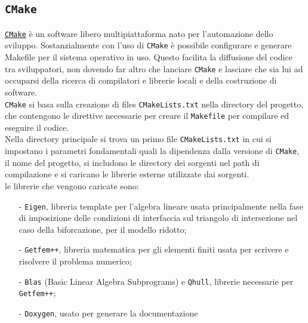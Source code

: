 \subsection{\texttt{CMake}}
\href{http://www.cmake.org/}{\texttt{CMake}} è un software libero multipiattaforma nato per l'automazione dello sviluppo. Sostanzialmente con l'uso di \texttt{CMake} è possibile configurare e generare Makefile per il sistema operativo in uso. Questo facilita la diffusione del codice tra sviluppatori, non dovendo far altro che lanciare \texttt{CMake} e lasciare che sia lui ad occuparsi della ricerca di compilatori e librerie locali e della costruzione di software.\\
\texttt{CMake} si basa sulla creazione di files \texttt{CMakeLists.txt} nella directory del progetto, che contengono le direttive necessarie per creare il \texttt{Makefile} per compilare ed eseguire il codice. \\
Nella directory principale si trova un primo file \texttt{CMakeLists.txt} in cui si impostano i parametri fondamentali quali la dipendenza dalla versione di \texttt{CMake}, il nome del progetto, si includono le directory dei sorgenti nel path di compilazione e si caricano le librerie esterne utilizzate dai sorgenti. \\
le librerie che vengono caricate sono:
\begin{enumerate}
\item[-] \texttt{Eigen}, libreria template per l'algebra lineare usata principalmente nella fase di imposizione delle condizioni di interfaccia sul triangolo di intersezione nel caso della biforcazione, per il modello ridotto;
\item[-] \texttt{Getfem++}, libreria matematica per gli elementi finiti usata per scrivere e risolvere il problema numerico;
\item[-] \texttt{Blas} (Basic Linear Algebra Subprograms) e \texttt{Qhull}, librerie necessarie per \texttt{Getfem++};
\item[-] \texttt{Doxygen}, usato per generare la documentazione
\end{enumerate}

